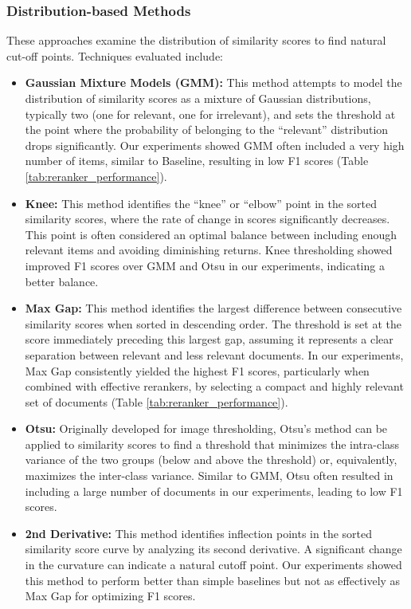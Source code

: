 \subsubsection{Distribution-based Methods}
These approaches examine the distribution of similarity scores to find natural cut-off points. Techniques evaluated include:
\begin{itemize}
    \item \textbf{Gaussian Mixture Models (GMM):} This method attempts to model the distribution of similarity scores as a mixture of Gaussian distributions, typically two (one for relevant, one for irrelevant), and sets the threshold at the point where the probability of belonging to the \enquote{relevant} distribution drops significantly. Our experiments showed GMM often included a very high number of items, similar to Baseline, resulting in low F1 scores (Table \ref{tab:reranker_performance}).
    \item \textbf{Knee:} This method identifies the \enquote{knee} or \enquote{elbow} point in the sorted similarity scores, where the rate of change in scores significantly decreases. This point is often considered an optimal balance between including enough relevant items and avoiding diminishing returns. Knee thresholding showed improved F1 scores over GMM and Otsu in our experiments, indicating a better balance.
    \item \textbf{Max Gap:} This method identifies the largest difference between consecutive similarity scores when sorted in descending order. The threshold is set at the score immediately preceding this largest gap, assuming it represents a clear separation between relevant and less relevant documents. In our experiments, Max Gap consistently yielded the highest F1 scores, particularly when combined with effective rerankers, by selecting a compact and highly relevant set of documents (Table \ref{tab:reranker_performance}).
    \item \textbf{Otsu:} Originally developed for image thresholding, Otsu's method can be applied to similarity scores to find a threshold that minimizes the intra-class variance of the two groups (below and above the threshold) or, equivalently, maximizes the inter-class variance. Similar to GMM, Otsu often resulted in including a large number of documents in our experiments, leading to low F1 scores.
    \item \textbf{2nd Derivative:} This method identifies inflection points in the sorted similarity score curve by analyzing its second derivative. A significant change in the curvature can indicate a natural cutoff point. Our experiments showed this method to perform better than simple baselines but not as effectively as Max Gap for optimizing F1 scores.
\end{itemize}

